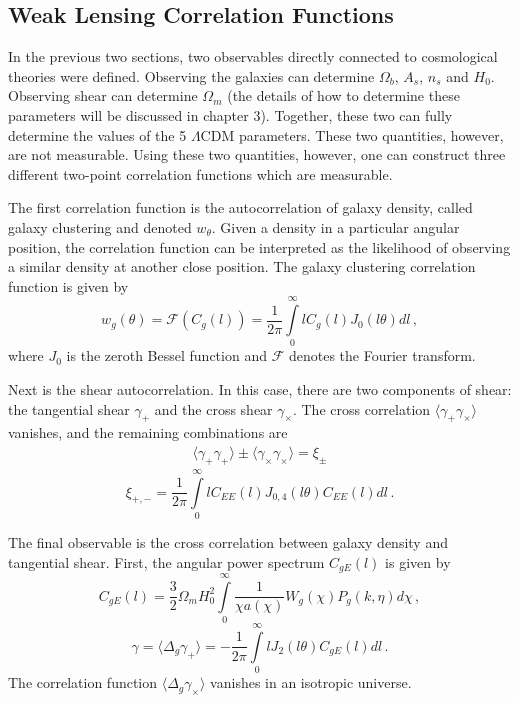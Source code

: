 \subsection{Weak Lensing Correlation Functions}
In the previous two sections, two observables directly connected to cosmological theories were defined. Observing the galaxies can determine $\Omega_b$, $A_s$, $n_s$ and $H_0$. Observing shear can determine $\Omega_m$ (the details of how to determine these parameters will be discussed in chapter 3). Together, these two can fully determine the values of the 5 $\Lambda$CDM parameters. These two quantities, however, are not measurable. Using these two quantities, however, one can construct three different two-point correlation functions which are measurable.

The first correlation function is the autocorrelation of galaxy density, called galaxy clustering and denoted $w_\theta$. Given a density in a particular angular position, the correlation function can be interpreted as the likelihood of observing a similar density at another close position. The galaxy clustering correlation function is given by
\begin{equation}
	w_g(\theta) = \mathcal{F}(C_g(l)) = \frac{1}{2\pi}\int\limits_0^\infty l C_g(l) J_0(l\theta)dl\,,
\end{equation}
where $J_0$ is the zeroth Bessel function and $\mathcal{F}$ denotes the Fourier transform.

Next is the shear autocorrelation. In this case, there are two components of shear: the tangential shear $\gamma_+$ and the cross shear $\gamma_\times$. The cross correlation $\langle \gamma_+ \gamma_\times \rangle$ vanishes, and the remaining combinations are
\begin{equation}
	\begin{split}
		\langle \gamma_+\gamma_+ \rangle \pm \langle \gamma_\times \gamma_\times \rangle = \xi_\pm
	\end{split}
\end{equation}
\begin{equation}
	\xi_{+,-} = \frac{1}{2\pi}\int\limits_0^\infty l C_{EE}(l) J_{0,4}(l\theta)C_{EE}(l)dl\,.
\end{equation}

The final observable is the cross correlation between galaxy density and tangential shear. First, the angular power spectrum $C_{gE}(l)$ is given by
\begin{equation}
	C_{gE}(l) = \frac{3}{2}\Omega_mH_0^2 \int\limits_0^\infty \frac{1}{\chi a(\chi)}W_g(\chi)P_g(k,\eta) d\chi\,,
\end{equation}
\begin{equation}
	\gamma = \langle \Delta_g\gamma_+\rangle = -\frac{1}{2\pi}\int\limits_0^\infty l J_2(l\theta)C_{gE}(l)dl\,.
\end{equation}
The correlation function $\langle \Delta_g\gamma_\times\rangle$ vanishes in an isotropic universe.

